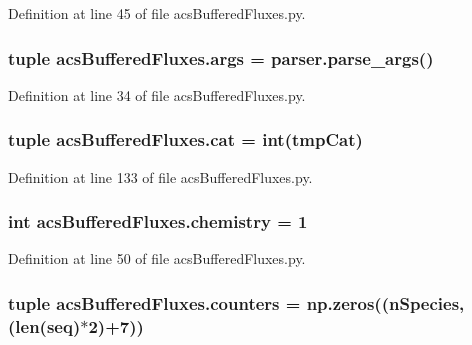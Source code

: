 Definition at line 45 of file acs\-Buffered\-Fluxes.\-py.

\hypertarget{a00098_afa2d0b9fb021746e05cd06277997da04}{
\subsubsection[{args}]{\setlength{\rightskip}{0pt plus 5cm}tuple acs\-Buffered\-Fluxes.\-args = parser.\-parse\-\_\-args()}}\label{a00098_afa2d0b9fb021746e05cd06277997da04}


Definition at line 34 of file acs\-Buffered\-Fluxes.\-py.

\hypertarget{a00098_ad351972f8ea18b9bf9b58f572c84534e}{
\subsubsection[{cat}]{\setlength{\rightskip}{0pt plus 5cm}tuple acs\-Buffered\-Fluxes.\-cat = int(tmp\-Cat)}}\label{a00098_ad351972f8ea18b9bf9b58f572c84534e}


Definition at line 133 of file acs\-Buffered\-Fluxes.\-py.

\hypertarget{a00098_ab4fd705796fd835a4238fecdc3caf76e}{
\subsubsection[{chemistry}]{\setlength{\rightskip}{0pt plus 5cm}int acs\-Buffered\-Fluxes.\-chemistry = 1}}\label{a00098_ab4fd705796fd835a4238fecdc3caf76e}


Definition at line 50 of file acs\-Buffered\-Fluxes.\-py.

\hypertarget{a00098_ab6476d4caeb73c29cf068374a1c8285d}{
\subsubsection[{counters}]{\setlength{\rightskip}{0pt plus 5cm}tuple acs\-Buffered\-Fluxes.\-counters = np.\-zeros((n\-Species,(len(seq)$\ast$2)+7))}}\label{a00098_ab6476d4caeb73c29cf068374a1c8285d}


